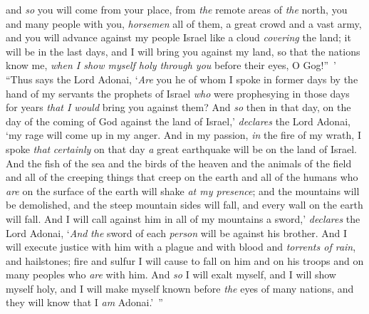 \begin{biblechapter}
\verse and \textit{so} you will come from your place, from \textit{the} remote areas of \textit{the} north, you and many people with you, \textit{horsemen} all of them, a great crowd and a vast army,
\verse and you will advance against my people Israel like a cloud \textit{covering} the land; it will be in the last days, and I will bring you against my land, so that the nations know me, \textit{when I show myself holy through you} before their eyes, O Gog!” ’
\verse “Thus says the Lord Adonai, ‘\textit{Are} you he of whom I spoke in former days by the hand of my servants the prophets of Israel \textit{who} were prophesying in those days for years \textit{that I would} bring you against them?
\verse And \textit{so} then in that day, on the day of the coming of God against the land of Israel,’ \textit{declares} the Lord Adonai, ‘my rage will come up in my anger.
\verse And in my passion, \textit{in} the fire of my wrath, I spoke \textit{that} \textit{certainly} on that day \textit{a} great earthquake will be on the land of Israel.
\verse And the fish of the sea and the birds of the heaven and the animals of the field and all of the creeping things that creep on the earth and all of the humans who \textit{are} on the surface of the earth will shake \textit{at my presence}; and the mountains will be demolished, and the steep mountain sides will fall, and every wall on the earth will fall.
\verse And I will call against him in all of my mountains a sword,’ \textit{declares} the Lord Adonai, ‘\textit{And} \textit{the} sword of each \textit{person} will be against his brother.
\verse And I will execute justice with him with a plague and with blood and \textit{torrents of rain}, and hailstones; fire and sulfur I will cause to fall on him and on his troops and on many peoples who \textit{are} with him.
\verse And \textit{so} I will exalt myself, and I will show myself holy, and I will make myself known before \textit{the} eyes of many nations, and they will know that I \textit{am} Adonai.’ ”
\end{biblechapter}

